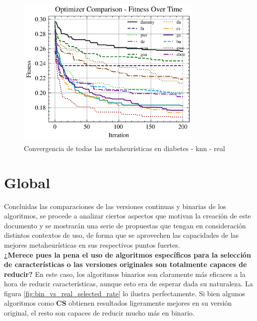 \begin{figure}[htp]
    \includegraphics[width=0.8\textwidth]{imagenes/fitness_charts/img/real/diabetes/optimizers_fitness_knn.png}
    \caption{Convergencia de todas las metaheurísticas en diabetes - knn - real}
\end{figure}

\section{Global}
Concluidas las comparaciones de las versiones continuas y binarias de los algoritmos, se procede a analizar ciertos aspectos que motivan la creación de este documento y se mostrarán una serie de propuestas que tengan en consideración distintos contextos de uso, de forma que se aprovechen las capacidades de las mejores metaheurísticas en sus respectivos puntos fuertes.\\[6pt]
\textbf{¿Merece pues la pena el uso de algoritmos específicos para la selección de características o las versiones originales son totalmente capaces de reducir?} En este caso, los algoritmos binarios son claramente más eficaces a la hora de reducir características, aunque esto era de esperar dada su naturaleza. La figura \ref{fig:bin_vs_real_selected_rate} lo ilustra perfectamente. Si bien algunos algoritmos como \textbf{CS} obtienen resultados ligeramente mejores en su versión original, el resto son capaces de reducir mucho más en binario.

